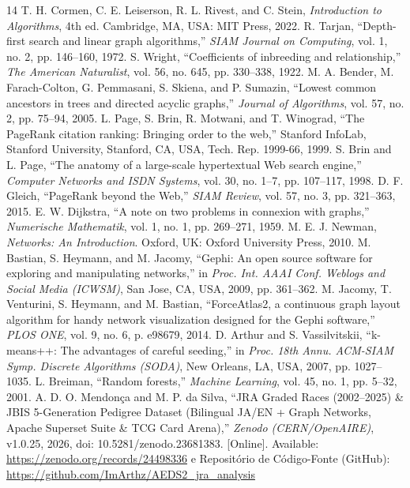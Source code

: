 \documentclass[conference]{IEEEtran}
\begin{document}
\begin{thebibliography}{14}
 T. H. Cormen, C. E. Leiserson, R. L. Rivest, and C. Stein, \textit{Introduction to Algorithms}, 4th ed. Cambridge, MA, USA: MIT Press, 2022.
 R. Tarjan, ``Depth-first search and linear graph algorithms,'' \textit{SIAM Journal on Computing}, vol. 1, no. 2, pp. 146--160, 1972.
 S. Wright, ``Coefficients of inbreeding and relationship,'' \textit{The American Naturalist}, vol. 56, no. 645, pp. 330--338, 1922.
 M. A. Bender, M. Farach-Colton, G. Pemmasani, S. Skiena, and P. Sumazin, ``Lowest common ancestors in trees and directed acyclic graphs,'' \textit{Journal of Algorithms}, vol. 57, no. 2, pp. 75--94, 2005.
 L. Page, S. Brin, R. Motwani, and T. Winograd, ``The PageRank citation ranking: Bringing order to the web,'' Stanford InfoLab, Stanford University, Stanford, CA, USA, Tech. Rep. 1999-66, 1999.
 S. Brin and L. Page, ``The anatomy of a large-scale hypertextual Web search engine,'' \textit{Computer Networks and ISDN Systems}, vol. 30, no. 1--7, pp. 107--117, 1998.
 D. F. Gleich, ``PageRank beyond the Web,'' \textit{SIAM Review}, vol. 57, no. 3, pp. 321--363, 2015.
 E. W. Dijkstra, ``A note on two problems in connexion with graphs,'' \textit{Numerische Mathematik}, vol. 1, no. 1, pp. 269--271, 1959.
 M. E. J. Newman, \textit{Networks: An Introduction}. Oxford, UK: Oxford University Press, 2010.
 M. Bastian, S. Heymann, and M. Jacomy, ``Gephi: An open source software for exploring and manipulating networks,'' in \textit{Proc. Int. AAAI Conf. Weblogs and Social Media (ICWSM)}, San Jose, CA, USA, 2009, pp. 361--362.
 M. Jacomy, T. Venturini, S. Heymann, and M. Bastian, ``ForceAtlas2, a continuous graph layout algorithm for handy network visualization designed for the Gephi software,'' \textit{PLOS ONE}, vol. 9, no. 6, p. e98679, 2014.
 D. Arthur and S. Vassilvitskii, ``k-means++: The advantages of careful seeding,'' in \textit{Proc. 18th Annu. ACM-SIAM Symp. Discrete Algorithms (SODA)}, New Orleans, LA, USA, 2007, pp. 1027--1035.
 L. Breiman, ``Random forests,'' \textit{Machine Learning}, vol. 45, no. 1, pp. 5--32, 2001.
 A. D. O. Mendonça and M. P. da Silva, ``JRA Graded Races (2002--2025) \& JBIS 5-Generation Pedigree Dataset (Bilingual JA/EN + Graph Networks, Apache Superset Suite \& TCG Card Arena),'' \textit{Zenodo (CERN/OpenAIRE)}, v1.0.25, 2026, doi: 10.5281/zenodo.23681383. [Online]. Available: \url{https://zenodo.org/records/24498336} e Repositório de Código-Fonte (GitHub): \url{https://github.com/ImArthz/AEDS2_jra_analysis}
\end{thebibliography}
\end{document}
